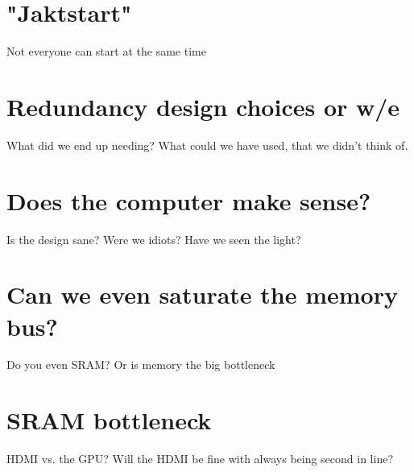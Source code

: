 \documentclass[../main/report.tex]{subfiles}
\begin{document}




\section{"Jaktstart"}

Not everyone can start at the same time

\section{Redundancy design choices or w/e}
What did we end up needing?
What could we have used, that we didn't think of.

\section{Does the computer make sense?}
Is the design sane?
Were we idiots?
Have we seen the light?

\section{Can we even saturate the memory bus?}
Do you even SRAM?
Or is memory the big bottleneck

\section{SRAM bottleneck}
HDMI vs. the GPU?
Will the HDMI be fine with always being second in line?


\end{document}
